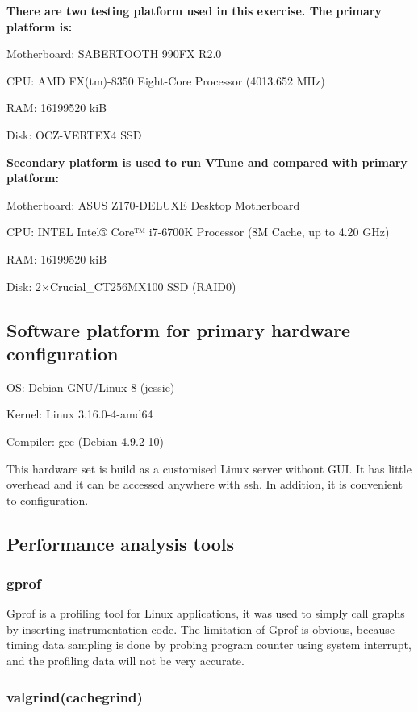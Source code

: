 \documentclass[conference]{IEEEtran}
\begin{document}
\textbf{There are two testing platform used in this exercise. The primary platform is:}

Motherboard:	SABERTOOTH 990FX R2.0

CPU:	AMD FX(tm)-8350 Eight-Core Processor (4013.652 MHz)

RAM:	16199520 kiB

Disk:	OCZ-VERTEX4 SSD

\textbf{Secondary platform is used to run VTune and compared with primary platform:}

Motherboard:	ASUS Z170-DELUXE Desktop Motherboard

CPU:	INTEL Intel® Core™ i7-6700K Processor (8M Cache, up to 4.20 GHz)

RAM:	16199520 kiB

Disk:	2$\times$Crucial\_CT256MX100 SSD (RAID0)
\subsection{Software platform for primary hardware configuration}

OS:	Debian GNU/Linux 8 (jessie)

Kernel:	Linux 3.16.0-4-amd64

Compiler:	gcc (Debian 4.9.2-10)

This hardware set is build as a customised Linux server without GUI. It has little overhead and it can be accessed anywhere with ssh. In addition, it is convenient to configuration. 

\subsection{Performance analysis tools}

\subsubsection{gprof}

Gprof is a profiling tool for Linux applications, it was used to simply call graphs by inserting instrumentation code. The limitation of Gprof is obvious, because timing data sampling is done by probing program counter using system interrupt, and the profiling data will not be very accurate.
\cite{graham1982gprof}

\subsubsection{valgrind(cachegrind)}
\end{document}
